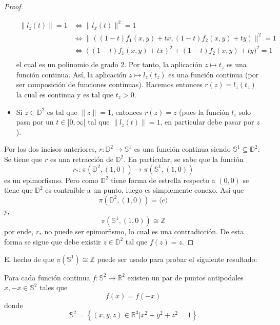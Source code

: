\documentclass{article}
\newcounter{it}
\theoremstyle{largebreak}
\newcommand\cf[3]{\ensuremath{#1:#2\rightarrow#3}}
\begin{document}
\begin{proof}
\begin{itemize}
\begin{equation*}
                \begin{split}
                    \|l_z(t)\|=1&\iff \|l_x(t)\|^2=1\\
                    &\iff\|((1-t)f_1(x,y)+tx,(1-t)f_2(x,y)+ty)\|^2=1\\
                    &\iff((1-t)f_1(x,y)+tx)^2+(1-t)f_2(x,y)+ty)^2=1\\
                \end{split}
            \end{equation*}
            el cual es un polinomio de grado 2. Por tanto, la aplicación $z\mapsto t_z$ es una función continua. Así, la aplicación $z\mapsto l_z(t_z)$ es una función continua (por ser composición de funciones continuas). Hacemos entonces $r(z)=l_z(t_z)$ la cual es continua y es tal que $t_z>0$.
            \item Si $z\in\mathbb{D}^2$ es tal que $\|z\|=1$, entonces $r(z)=z$ (pues la función $l_z$ solo pasa por un $t\in]0,\infty[$ tal que $\|l_z(t)\|=1$, en particular debe pasar por $z$).
        \end{itemize}

        Por los dos incisos anteriores, $\cf{r}{\mathbb{D}^2}{\mathbb{S}^1}$ es una función continua siendo $\mathbb{S}^1\subseteq\mathbb{D}^2$. Se tiene que $r$ es una retracción de $\mathbb{D}^2$. En particular, se sabe que la función
        \begin{equation*}
            \cf{r_*}{\pi(\mathbb{D}^2,(1,0))}{\pi(\mathbb{S}^1,(1,0))}
        \end{equation*}
        es un epimorfismo. Pero como $\mathbb{D}^2$ tiene forma de estrella respecto a $(0,0)$ se tiene que $\mathbb{D}^2$ es contraíble a un punto, luego es simplemente conexo. Así que
        \begin{equation*}
            \pi(\mathbb{D}^2,(1,0))=\langle e\rangle
        \end{equation*}
        y,
        \begin{equation*}
            \pi(\mathbb{S}^1,(1,0))\cong\mathbb{Z}
        \end{equation*}
        por ende, $r_*$ no puede ser epimorfismo, lo cual es una contradicción. De esta forma se sigue que debe existir $z\in\mathbb{D}^2$ tal que $f(z)=z$.
    \end{proof}
    
    El hecho de que $\pi(\mathbb{S}^1)\cong\mathbb{Z}$ puede ser usado para probar el siguiente resultado:

    \begin{theor}
        Para cada función continua $\cf{f}{\mathbb{S}^2}{\mathbb{R}^2}$ existen un par de puntos antipodales $x,-x\in\mathbb{S}^2$ tales que
        \begin{equation*}
            f(x)=f(-x)
        \end{equation*}
        donde
        \begin{equation*}
            \mathbb{S}^2=\left\{(x,y,z)\in\mathbb{R}^3\Big|x^2+y^2+z^2=1\right\}
        \end{equation*}
    \end{theor}
\end{document}
